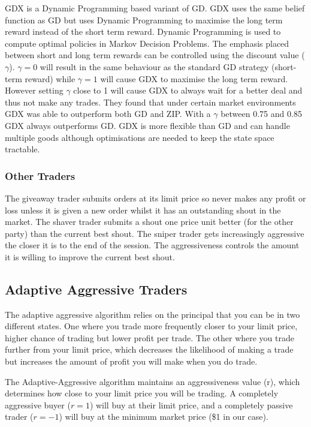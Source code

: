 \documentclass[preprint]{acm_proc_article-sp} %
\begin{document}
GDX\cite{gdx} is a Dynamic Programming based variant of GD.
GDX uses the same belief function as GD but uses Dynamic Programming to
maximise the long term reward instead of the short term reward.
Dynamic Programming is used to compute optimal policies in Markov Decision
Problems.
The emphasis placed between short and long term rewards can be controlled using
the discount value ($\gamma$).
$\gamma = 0$ will result in the same behaviour as the standard GD strategy
(short-term reward) while $\gamma = 1$ will cause GDX to maximise the long term
reward.
However setting $\gamma$ close to 1 will cause GDX to always wait for a better
deal and thus not make any trades.
They found that under certain market environments GDX was able to outperform
both GD and ZIP.
With a $\gamma$ between 0.75 and 0.85 GDX always outperforms GD.
GDX is more flexible than GD and can handle multiple goods although
optimisations are needed to keep the state space tractable.\\


\subsubsection{Other Traders}
The giveaway trader submits orders at its limit price so never makes any profit
or loss unless it is given a new order whilst it has an outstanding shout in
the market. The shaver trader submits a shout one price unit better (for the
other party) than the current best shout. The sniper trader gets increasingly
aggressive the closer it is to the end of the session. The aggressiveness
controls the amount it is willing to improve the current best shout.\\


\subsection{Adaptive Aggressive Traders} \label{sec:AA}
The adaptive aggressive algorithm relies on the principal that you can be in
two different states. One where you trade more frequently closer to your limit
price, higher chance of trading but lower profit per trade. The other where you
trade further from your limit price, which decreases the likelihood of making a
trade but increases the amount of profit you will make when you do trade.

The Adaptive-Aggressive algorithm maintains an aggressiveness value (r), which
determines how close to your limit price you will be trading. A completely
aggressive buyer ($r = 1$) will buy at their limit price, and a completely
passive trader ($r = -1$) will buy at the minimum market price (\$1 in our case).\\
\end{document}
